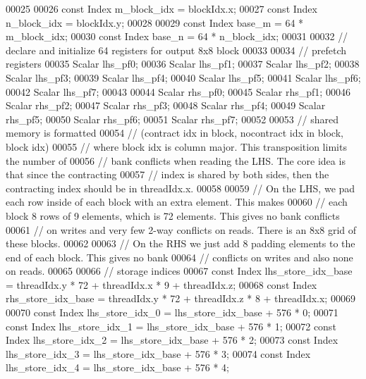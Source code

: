 \begin{DoxyCode}
00025 
00026   \textcolor{keyword}{const} Index m\_block\_idx = blockIdx.x;
00027   \textcolor{keyword}{const} Index n\_block\_idx = blockIdx.y;
00028 
00029   \textcolor{keyword}{const} Index base\_m = 64 * m\_block\_idx;
00030   \textcolor{keyword}{const} Index base\_n = 64 * n\_block\_idx;
00031 
00032   \textcolor{comment}{// declare and initialize 64 registers for output 8x8 block}
00033 
00034   \textcolor{comment}{// prefetch registers}
00035   Scalar lhs\_pf0;
00036   Scalar lhs\_pf1;
00037   Scalar lhs\_pf2;
00038   Scalar lhs\_pf3;
00039   Scalar lhs\_pf4;
00040   Scalar lhs\_pf5;
00041   Scalar lhs\_pf6;
00042   Scalar lhs\_pf7;
00043 
00044   Scalar rhs\_pf0;
00045   Scalar rhs\_pf1;
00046   Scalar rhs\_pf2;
00047   Scalar rhs\_pf3;
00048   Scalar rhs\_pf4;
00049   Scalar rhs\_pf5;
00050   Scalar rhs\_pf6;
00051   Scalar rhs\_pf7;
00052 
00053   \textcolor{comment}{// shared memory is formatted}
00054   \textcolor{comment}{// (contract idx in block, nocontract idx in block, block idx)}
00055   \textcolor{comment}{// where block idx is column major. This transposition limits the number of}
00056   \textcolor{comment}{// bank conflicts when reading the LHS. The core idea is that since the contracting}
00057   \textcolor{comment}{// index is shared by both sides, then the contracting index should be in threadIdx.x.}
00058 
00059   \textcolor{comment}{// On the LHS, we pad each row inside of each block with an extra element. This makes}
00060   \textcolor{comment}{// each block 8 rows of 9 elements, which is 72 elements. This gives no bank conflicts}
00061   \textcolor{comment}{// on writes and very few 2-way conflicts on reads. There is an 8x8 grid of these blocks.}
00062 
00063   \textcolor{comment}{// On the RHS we just add 8 padding elements to the end of each block. This gives no bank}
00064   \textcolor{comment}{// conflicts on writes and also none on reads.}
00065 
00066   \textcolor{comment}{// storage indices}
00067   \textcolor{keyword}{const} Index lhs\_store\_idx\_base = threadIdx.y * 72 + threadIdx.x * 9 + threadIdx.z;
00068   \textcolor{keyword}{const} Index rhs\_store\_idx\_base = threadIdx.y * 72 + threadIdx.z * 8 + threadIdx.x;
00069 
00070   \textcolor{keyword}{const} Index lhs\_store\_idx\_0 = lhs\_store\_idx\_base + 576 * 0;
00071   \textcolor{keyword}{const} Index lhs\_store\_idx\_1 = lhs\_store\_idx\_base + 576 * 1;
00072   \textcolor{keyword}{const} Index lhs\_store\_idx\_2 = lhs\_store\_idx\_base + 576 * 2;
00073   \textcolor{keyword}{const} Index lhs\_store\_idx\_3 = lhs\_store\_idx\_base + 576 * 3;
00074   \textcolor{keyword}{const} Index lhs\_store\_idx\_4 = lhs\_store\_idx\_base + 576 * 4;

\end{DoxyCode}
